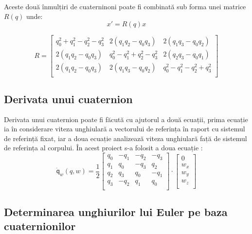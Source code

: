 Aceste două înmulțiri de cuaterninoni poate fi combinată sub forma unei matrice $R(q)$ unde:
\begin{equation}
x'=R(q)x
\end{equation}

\begin{equation}
\mathsf{\textit{R}} =
\begin{bmatrix}
q_0^2+q_1^2-q_2^2-q_3^2 & 2(q_1q_2-q_0q_3) & 2(q_1q_3-q_0q_2)\\
2(q_1q_2-q_0q_3) & q_0^2-q_1^2+q_2^2-q_3^2 & 2(q_2q_3-q_0q_1)\\
2(q_1q_2-q_0q_3) & 2(q_1q_3-q_0q_2) &q_0^2-q_1^2-q_2^2+q_3^2\\
\end{bmatrix}
\end{equation}

\subsection{Derivata unui cuaternion}
\-\hspace{1cm}Derivata unui cuaternion poate fi făcută cu ajutorul a două ecuații, prima ecuație ia în considerare viteza unghiulară a vectorului de referința în raport cu sistemul de referință fixat, iar a doua ecuație analizează viteza unghiulară față de sistemul de referința al corpului. În acest proiect s-a folosit a doua ecuație \cite{quatro}:
\begin{equation}
\mathsf{\dot{q}_\textit{w}(\textit{q},\textit{w})} =
\frac{1}{2}
\begin{bmatrix}
q_0 & -q_1 & -q_2 & -q_3\\
q_1 & q_0 & -q_3 & q_2\\
q_2 & q_3 & q_0 & -q_1\\
q_3 & -q_2 & q_1 & q_0\\
\end{bmatrix}
\cdot
\begin{bmatrix}
0\\
w_x\\
w_y\\
w_z\\
\end{bmatrix}
\end{equation}

\subsection{Determinarea unghiurilor lui Euler pe baza cuaternionilor}

